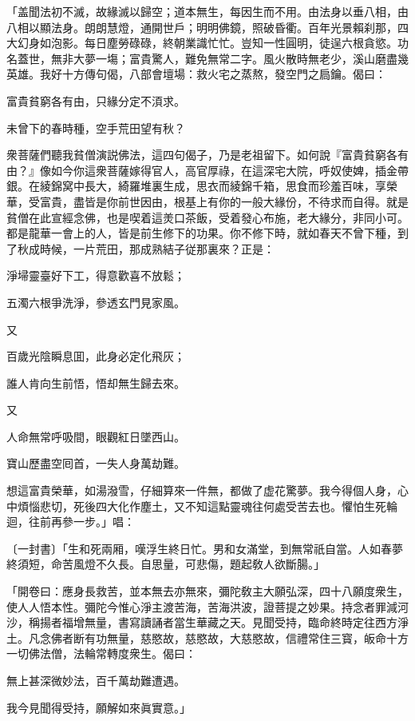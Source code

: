 \begin{myquote}[\markfont]
「盖聞法初不滅，故緣滅以歸空；道本無生，每因生而不用。由法身以垂八相，由八相以顯法身。朗朗慧燈，通開世戶；明明佛鏡，照破昏衢。百年光景賴刹那，四大幻身如泡影。每日塵勞碌碌，終朝業識忙忙。豈知一性圓明，徒逞六根貪慾。功名蓋世，無非大夢一塲；富貴驚人，難免無常二字。風火散時無老少，溪山磨盡幾英雄。我好十方傳句偈，八部會壇場：救火宅之蒸熬，發空門之扃鑰。偈曰：

{\kaishu
富貴貧窮各有由，只緣分定不湏求。

未曾下的春時種，空手荒田望有秋？
}

衆菩薩們聽我貧僧演説佛法，這四句偈子，乃是老祖留下。如何說『富貴貧窮各有由？』像如今你這衆菩薩嫁得官人，高官厚祿，在這深宅大院，呼奴使婢，插金帶銀。在綾錦窝中長大，綺羅堆裏生成，思衣而綾錦千箱，思食而珍羞百味，享榮華，受富貴，盡皆是你前世因由，根基上有你的一般大緣份，不待求而自得。就是貧僧在此宣經念佛，也是喫着這羙口茶飯，受着發心布施，老大緣分，非同小可。都是龍華一會上的人，皆是前生修下的功果。你不修下時，就如春天不曾下種，到了秋成時候，一片荒田，那成熟結子従那裏來？正是：

{\kaishu
淨埽靈臺好下工，得意歡喜不放鬆；

五濁六根爭洗淨，參透玄門見家風。
}

又

{\kaishu
百歲光陰瞬息囬，此身必定化飛灰；

誰人肯向生前悟，悟却無生歸去來。
}

又

{\kaishu
人命無常呼吸間，眼觀紅日墜西山。

寶山歷盡空囘首，一失人身萬劫難。
}

想這富貴榮華，如湯潑雪，仔細算來一件無，都做了虚花驚夢。我今得個人身，心中煩惱悲切，死後四大化作塵土，又不知這點靈魂往何處受苦去也。懼怕生死輪迴，往前再參一步。」{\small{唱}}：

〔一封書〕{\kaishu「生和死兩厢，嘆浮生終日忙。男和女滿堂，到無常祇自當。人如春夢終須短，命苦風燈不久長。自思量，可悲傷，題起敎人欲斷腸。」}

「開卷曰：應身長救苦，並本無去亦無來，彌陀敎主大願弘深，四十八願度衆生，使人人悟本性。彌陀今惟心淨主渡苦海，苦海洪波，證菩提之妙果。持念者罪減河沙，稱揚者福增無量，書寫讀誦者當生華藏之天。見聞受持，臨命終時定往西方淨土。凡念佛者断有功無量，慈愍故，慈愍故，大慈愍故，信禮常住三寳，皈命十方一切佛法僧，法輪常轉度衆生。偈曰：

{\kaishu
無上甚深微妙法，百千萬劫難遭遇。

我今見聞得受持，願解如來眞實意。」
}


\end{myquote}
